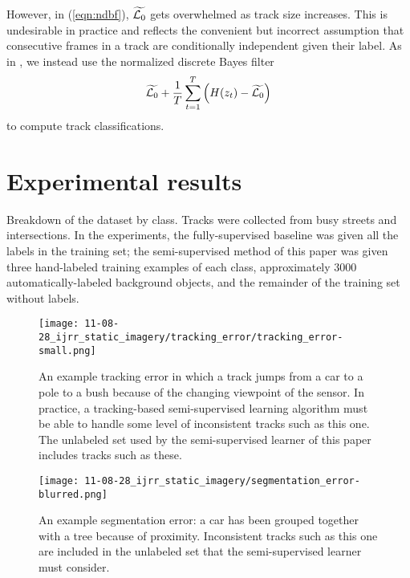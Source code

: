\documentclass[conference]{IEEEtran}
\begin{document}
However, in (\ref{eqn:ndbf}), $\widetilde{\mathcal{L}_0}$ gets overwhelmed as track size increases.  This is undesirable in practice and reflects the convenient but incorrect assumption that consecutive frames in a track are conditionally independent given their label.  As in \citep{Teichman2011}, we instead use the normalized discrete Bayes filter
\begin{align*}
\widetilde{\L_0} +\frac{1}{T} \sum_{t=1}^T \left( H(z_t) - \widetilde{\L_0} \right) \label{eqn:htr}
\end{align*}
to compute track classifications.

\section{Experimental results}

\begin{table}
  \centering
  
  \caption{Breakdown of the dataset by class.  Tracks were collected from busy streets and intersections.  In the experiments, the fully-supervised baseline was given all the labels in the training set; the semi-supervised method of this paper was given three hand-labeled training examples of each class, approximately 3000 automatically-labeled background objects, and the remainder of the training set without labels.}
  \label{tab:stc_tab}
\end{table}

\begin{figure*}
  \centering
  \texttt{[image: 11-08-28\_ijrr\_static\_imagery/tracking\_error/tracking\_error-small.png]}
  \caption{An example tracking error in which a track jumps from a car to a pole to a bush because of the changing viewpoint of the sensor.  In practice, a tracking-based semi-supervised learning algorithm must be able to handle some level of inconsistent tracks such as this one.  The unlabeled set used by the semi-supervised learner of this paper includes tracks such as these.}
  \label{fig:tracking_error}
\end{figure*}

\begin{figure}
  \centering
    \texttt{[image: 11-08-28\_ijrr\_static\_imagery/segmentation\_error-blurred.png]}
  \caption{An example segmentation error: a car has been grouped together with a tree because of proximity.  Inconsistent tracks such as this one are included in the unlabeled set that the semi-supervised learner must consider.}
  \label{fig:segmentation_error}
\end{figure}
\end{document}

